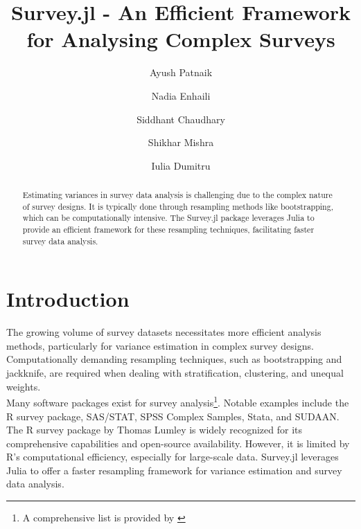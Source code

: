 \documentclass{article}
\begin{document}
\title{Survey.jl - An Efficient Framework for Analysing Complex Surveys}

\author[1]{Ayush Patnaik}
\author[2]{Nadia Enhaili}
\author[3]{Siddhant Chaudhary}
\author[1]{Shikhar Mishra}
\author[4]{Iulia Dumitru}



\maketitle


\begin{abstract}
    
    Estimating variances in survey data analysis is challenging due to the complex nature of survey designs. It is typically done through resampling methods like bootstrapping, which can be computationally intensive. The Survey.jl package leverages Julia to provide an efficient framework for these resampling techniques, facilitating faster survey data analysis.
    
\end{abstract}

\section{Introduction}

The growing volume of survey datasets necessitates more efficient analysis methods, particularly for variance estimation in complex survey designs. Computationally demanding resampling techniques, such as bootstrapping and jackknife, are required when dealing with stratification, clustering, and unequal weights. 
\\

Many software packages exist for survey analysis\footnote{A comprehensive list is provided by \cite{SummarySurveyAnalysis}}. Notable examples include the R survey package, SAS/STAT, SPSS Complex Samples, Stata, and SUDAAN. The R survey package by Thomas Lumley\cite{lumley2004analysis} is widely recognized for its comprehensive capabilities and open-source availability. However, it is limited by R's computational efficiency, especially for large-scale data. Survey.jl leverages Julia to offer a faster resampling framework for variance estimation and survey data analysis.
\end{document}
